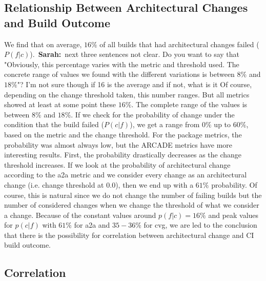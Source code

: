 \documentclass[sigplan, anonymous, review]{acmart}
\newcommand{\sn}[1]{{\color{blue}\textbf{Sarah:}~#1}}
\begin{document}
\subsection{Relationship Between Architectural Changes and Build Outcome}

We find that on average, $16\%$ of all builds that had architectural changes failed ($P(f|c)$).~\sn{next three sentences not clear. Do you want to say that "Obviously, this percentage varies with the metric and threshold used. The concrete range of values we found with the different variations is between $8\%$ and $18\%$"? I'm not sure though if 16 is the average and if not, what is it} Of course, depending on the change threshold taken, this number ranges. But all metrics showed at least at some point these $16\%$. The complete range of the values is between $8\%$ and $18\%$. 
If we check for the probability of change under the condition that the build failed ($P(c|f)$), we get a range from $0\%$ up to $60\%$, based on the metric and the change threshold. For the package metrics, the probability was almost always low, but the ARCADE metrics have more interesting results. First, the probability drastically decreases as the change threshold increases. If we look at the probability of architectural change according to the a2a metric and we consider every change as an architectural change (i.e. change threshold at $0.0$), then we end up with a $61\%$ probability. Of course, this is natural since we do not change the number of failing builds but the number of considered changes when we change the threshold of what we consider a change. 
Because of the constant values around $p(f|c) = 16\%$ and peak values for $p(c|f)$ with $61\%$ for a2a and $35-36\%$ for cvg, we are led to the conclusion that there is the possibility for correlation between architectural change and CI build outcome.

\subsection{Correlation}


\end{document}
